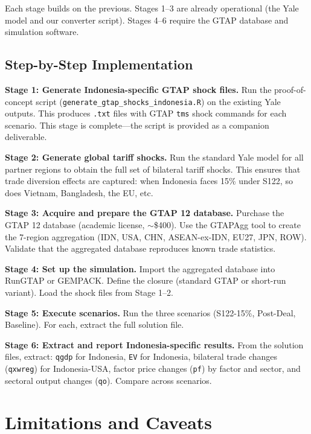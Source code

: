 \documentclass[12pt,a4paper]{article}
\begin{document}
\noindent Each stage builds on the previous. Stages 1--3 are already operational (the Yale model and our converter script). Stages 4--6 require the GTAP database and simulation software.

\subsection{Step-by-Step Implementation}

\textbf{Stage 1: Generate Indonesia-specific GTAP shock files.}
Run the proof-of-concept script (\texttt{generate\_gtap\_shocks\_indonesia.R}) on the existing Yale outputs. This produces \texttt{.txt} files with GTAP \texttt{tms} shock commands for each scenario. This stage is complete---the script is provided as a companion deliverable.

\textbf{Stage 2: Generate global tariff shocks.}
Run the standard Yale model for all partner regions to obtain the full set of bilateral tariff shocks. This ensures that trade diversion effects are captured: when Indonesia faces 15\% under S122, so does Vietnam, Bangladesh, the EU, etc.

\textbf{Stage 3: Acquire and prepare the GTAP 12 database.}
Purchase the GTAP 12 database (academic license, $\sim$\$400). Use the GTAPAgg tool to create the 7-region aggregation (IDN, USA, CHN, ASEAN-ex-IDN, EU27, JPN, ROW). Validate that the aggregated database reproduces known trade statistics.

\textbf{Stage 4: Set up the simulation.}
Import the aggregated database into RunGTAP or GEMPACK. Define the closure (standard GTAP or short-run variant). Load the shock files from Stage 1--2.

\textbf{Stage 5: Execute scenarios.}
Run the three scenarios (S122-15\%, Post-Deal, Baseline). For each, extract the full solution file.

\textbf{Stage 6: Extract and report Indonesia-specific results.}
From the solution files, extract: \texttt{qgdp} for Indonesia, \texttt{EV} for Indonesia, bilateral trade changes (\texttt{qxwreg}) for Indonesia-USA, factor price changes (\texttt{pf}) by factor and sector, and sectoral output changes (\texttt{qo}). Compare across scenarios.

\section{Limitations and Caveats}
\label{sec:limitations}
\end{document}
